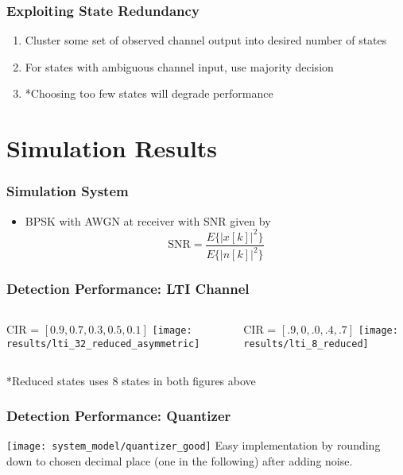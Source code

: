 \documentclass[10pt,tgadventor, onlymath]{beamer}
\begin{document}
\begin{frame}
	\frametitle{Exploiting State Redundancy}
\begin{enumerate}
\item Cluster some set of observed channel output into desired number of states
\pause
\item For states with ambiguous channel input, use majority decision
\pause
\item *Choosing too few states will degrade performance
\end{enumerate}
\end{frame}


\section{Simulation Results}
\begin{frame}
\frametitle{Simulation System}
\begin{itemize}
\item BPSK with AWGN at receiver with SNR given by 
\begin{equation*}
\text{SNR} = \frac{E\{|x[k]|^2\}}{E\{|n[k]|^2\}}
\end{equation*}
\end{itemize}
\end{frame}

\begin{frame}
\frametitle{Detection Performance: LTI Channel}
\begin{columns}
\begin{column}{0.5\linewidth}
\centering
CIR = $[0.9, 0.7, 0.3, 0.5, 0.1]$
	\texttt{[image: results/lti\_32\_reduced\_asymmetric]}
\end{column}
\begin{column}{0.5\linewidth}
\centering
CIR = $[.9, 0, .0, .4, .7]$
	\texttt{[image: results/lti\_8\_reduced]}
\end{column}
\end{columns}
*Reduced states uses 8 states in both figures above
\end{frame}
\begin{frame}
\frametitle{Detection Performance: Quantizer}
	\texttt{[image: system\_model/quantizer\_good]}
Easy implementation by rounding down to chosen decimal place (one in the following) after adding noise. 
\end{frame}
\end{document}
